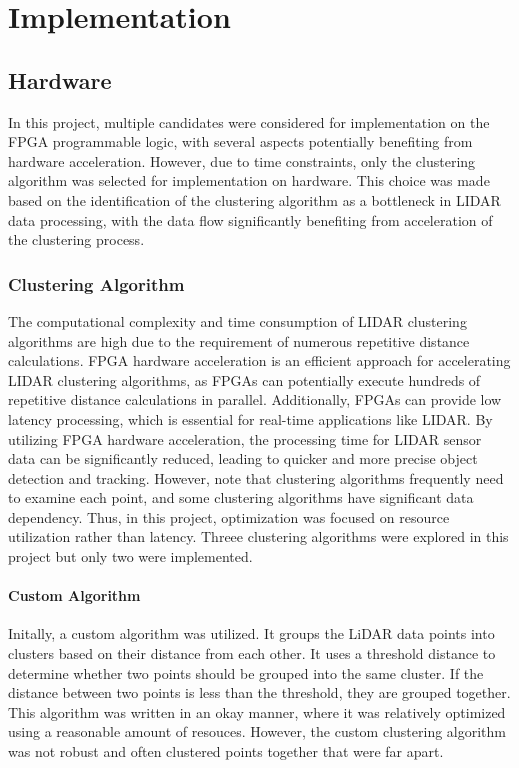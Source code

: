 \documentclass[journal]{IEEEtran} %
\begin{document}
\section{Implementation}

\subsection{Hardware}
In this project, multiple candidates were considered for implementation on the FPGA programmable logic, with several aspects potentially benefiting from hardware acceleration. However, due to time constraints, only the clustering algorithm was selected for implementation on hardware. This choice was made based on the identification of the clustering algorithm as a bottleneck in LIDAR data processing, with the data flow significantly benefiting from acceleration of the clustering process.

\subsubsection{Clustering Algorithm}
The computational complexity and time consumption of LIDAR clustering algorithms are high due to the requirement of numerous repetitive distance calculations. FPGA hardware acceleration is an efficient approach for accelerating LIDAR clustering algorithms, as FPGAs can potentially execute hundreds of repetitive distance calculations in parallel. Additionally, FPGAs can provide low latency processing, which is essential for real-time applications like LIDAR. By utilizing FPGA hardware acceleration, the processing time for LIDAR sensor data can be significantly reduced, leading to quicker and more precise object detection and tracking. However, note that clustering algorithms frequently need to examine each point, and some clustering algorithms have significant data dependency. Thus, in this project, optimization was focused on resource utilization rather than latency. Threee clustering algorithms were explored in this project but only two were implemented.

\paragraph{Custom Algorithm}
Initally, a custom algorithm was utilized. It groups the LiDAR data points into clusters based on their distance from each other. It uses a threshold distance to determine whether two points should be grouped into the same cluster. If the distance between two points is less than the threshold, they are grouped together. This algorithm was written in an okay manner, where it was relatively optimized using a reasonable amount of resouces. However, the custom clustering algorithm was not robust and often clustered points together that were far apart.
\end{document}
